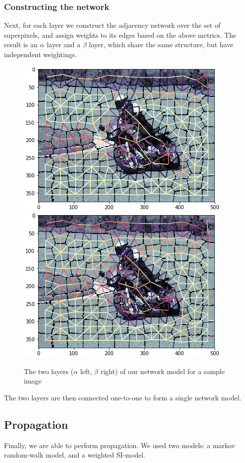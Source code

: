 \documentclass[twocolumn]{article}
\newcommand{\figlab}[1]{\label{fig:#1}}
\begin{document}
\subsubsection{Constructing the network}

Next, for each layer we construct the adjacency network over the set of superpixels, and assign weights to its edges based on the above metrics. The result is an $\alpha$ layer and a $\beta$ layer, which share the same structure, but have independent weightings.

\begin{figure}[h]
  \centering
  \includegraphics[width=0.49\linewidth]{figs/alpha_graph.png}
  \includegraphics[width=0.49\linewidth]{figs/beta_graph.png}
  \caption{
    The two layers ($\alpha$ left, $\beta$ right) of our network model for a sample image
  }
  \figlab{ab_graph}
\end{figure}

The two layers are then connected one-to-one to form a single network model.

\subsection{Propagation}

Finally, we are able to perform propagation. We used two models: a markov random-walk model, and a weighted SI-model.
\end{document}

